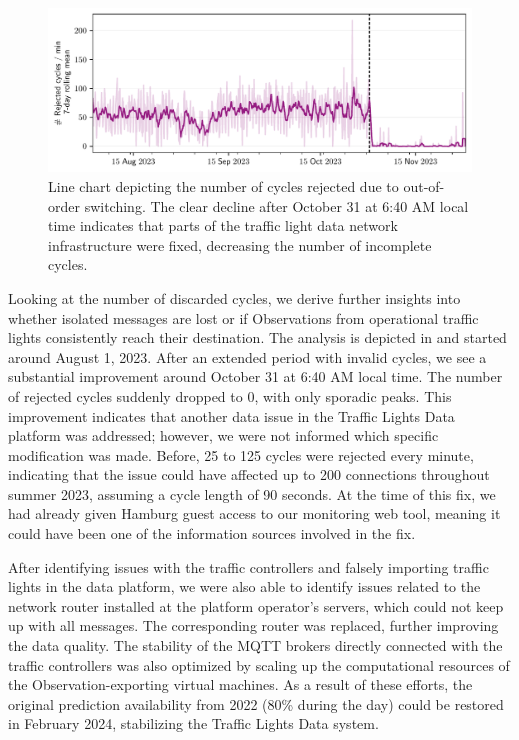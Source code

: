 \begin{figure}[t]
    \centering
    \includegraphics[width=\linewidth]{images/monitoring-rejected-cycles.pdf}
    \caption{Line chart depicting the number of cycles rejected due to out-of-order switching. The clear decline after October 31 at 6:40 AM local time indicates that parts of the traffic light data network infrastructure were fixed, decreasing the number of incomplete cycles.}\label{fig:monitoring-rejected-cycles}
\end{figure}

Looking at the number of discarded cycles, we derive further insights into whether isolated messages are lost or if Observations from operational traffic lights consistently reach their destination. The analysis is depicted in  and started around August 1, 2023. After an extended period with invalid cycles, we see a substantial improvement around October 31 at 6:40 AM local time. The number of rejected cycles suddenly dropped to 0, with only sporadic peaks. This improvement indicates that another data issue in the Traffic Lights Data platform was addressed; however, we were not informed which specific modification was made. Before, 25 to 125 cycles were rejected every minute, indicating that the issue could have affected up to 200 connections throughout summer 2023, assuming a cycle length of 90 seconds. At the time of this fix, we had already given Hamburg guest access to our monitoring web tool, meaning it could have been one of the information sources involved in the fix.

After identifying issues with the traffic controllers and falsely importing traffic lights in the data platform, we were also able to identify issues related to the network router installed at the platform operator's servers, which could not keep up with all messages. The corresponding router was replaced, further improving the data quality. The stability of the MQTT brokers directly connected with the traffic controllers was also optimized by scaling up the computational resources of the Observation-exporting virtual machines. As a result of these efforts, the original prediction availability from 2022 (80\% during the day) could be restored in February 2024, stabilizing the Traffic Lights Data system.

